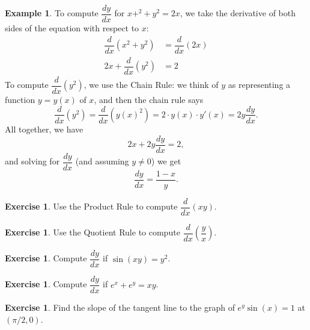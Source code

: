 \documentclass[11pt,reqno,final]{amsart}
\numberwithin{figure}{section}
\theoremstyle{definition} %
\newtheorem{example}[equation]{Example}%
\newtheorem{exercise}[question]{Exercise}
\begin{document}
\newpage

\begin{example}
        To compute $\dfrac{dy}{dx}$ for $x+^2 + y^2  = 2x$,
        we take the derivative of both sides of the equation with respect to $x$:
        \begin{align*}
          \dfrac{d}{dx}(x^2 + y^2) &= \dfrac{d}{dx}(2x)\\
          2x + \dfrac{d}{dx}(y^2) &= 2
        \end{align*}
        To compute $\dfrac{d}{dx}(y^2)$, we use the Chain Rule: we think of $y$ as representing a function $y = y(x)$ of $x$,
        and then the chain rule says
        \[
                \dfrac{d}{dx}(y^2) = \dfrac{d}{dx}(y(x)^2) = 2 \cdot y(x) \cdot y'(x) = 2y\dfrac{dy}{dx}.
        \]
        All together, we have
        \[
                2x + 2y\dfrac{dy}{dx} = 2,
        \]
        and solving for $\dfrac{dy}{dx}$ (and assuming $y \neq 0$) we get
        \[
                \dfrac{dy}{dx} = \dfrac{1 - x}{y}.
        \]
\end{example}

\begin{exercise}
        Use the Product Rule to compute $\dfrac{d}{dx}(xy)$.
        \vfill
\end{exercise}

\begin{exercise}
        Use the Quotient Rule to compute $\dfrac{d}{dx}\left( \dfrac{y}{x} \right)$.
        \vfill
\end{exercise}

\newpage

\begin{exercise}
        Compute $\dfrac{dy}{dx}$ if $\sin(xy) = y^2$.
        \vfill
\end{exercise}

\begin{exercise}
        Compute $\dfrac{dy}{dx}$ if $e^x + e^y = xy$.
        \vfill
\end{exercise}

\begin{exercise}
        Find the slope of the tangent line to the graph of $e^y\sin(x) = 1$ at $(\pi/2, 0)$.
        \vfill
\end{exercise}
\end{document}
